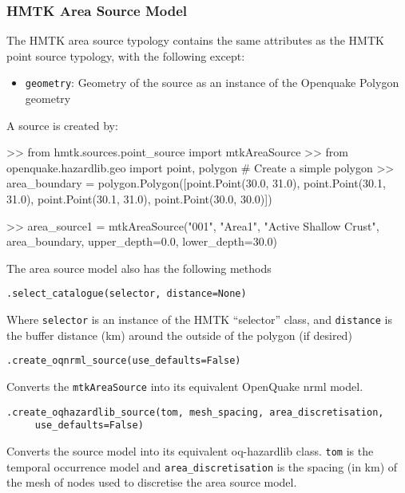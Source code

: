 \subsubsection{HMTK Area Source Model}

The HMTK area source typology contains the same attributes as the HMTK point source typology, with the following except:

\begin{itemize}
\item \verb=geometry=: Geometry of the source as an instance of the Openquake Polygon geometry
\end{itemize}

A source is created by:

\begin{python}[frame=single]
>> from hmtk.sources.point_source import mtkAreaSource
>> from openquake.hazardlib.geo import point, polygon
# Create a simple polygon
>> area_boundary = polygon.Polygon([point.Point(30.0, 31.0),
                                    point.Point(30.1, 31.0),
                                    point.Point(30.1, 31.0),
                                    point.Point(30.0, 30.0)]) 

>> area_source1 = mtkAreaSource("001",
                                "Area1",
                                "Active Shallow Crust",
                                area_boundary,
                                upper_depth=0.0,
                                lower_depth=30.0)
\end{python}

The area source model also has the following methods

\verb;.select_catalogue(selector, distance=None);

Where \verb=selector= is an instance of the HMTK ``selector'' class, and \verb=distance= is the buffer distance (km) around the outside of the polygon (if desired)


\verb;.create_oqnrml_source(use_defaults=False);

Converts the \verb=mtkAreaSource= into its equivalent OpenQuake nrml model.

\verb;.create_oqhazardlib_source(tom, mesh_spacing, area_discretisation,;\\
\verb;     use_defaults=False);

Converts the source model into its equivalent oq-hazardlib class. \verb=tom= is the temporal occurrence model and \verb=area_discretisation= is the spacing (in km) of the mesh of nodes used to discretise the area source model.


